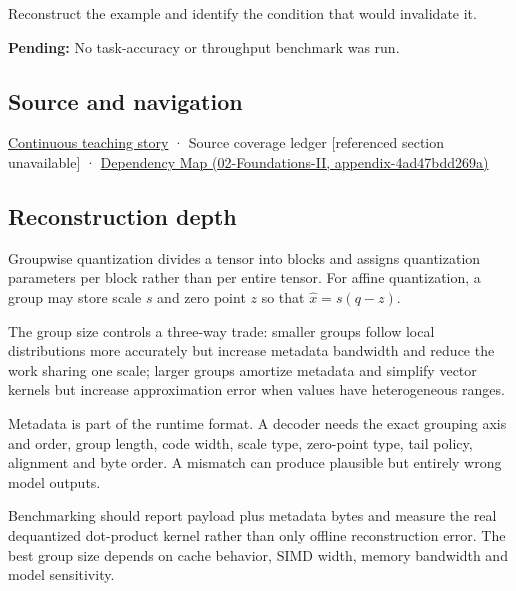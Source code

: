 Reconstruct the example and identify the condition that would invalidate it.

\textbf{Pending:} No task-accuracy or throughput benchmark was run.

\subsection{Source and navigation}\label{appendix-638204c40e8b-source-and-navigation}

\hyperref[01-foundations-i-ch001-choosing-what-information-to-keep]{Continuous teaching story} · {Source coverage ledger {[}referenced section unavailable{]}} · \href{../02-Foundations-II/main.pdf\#nameddest=appendix-4ad47bdd269a}{Dependency Map (02-Foundations-II, appendix-4ad47bdd269a)}

\subsection{Reconstruction depth}\label{appendix-638204c40e8b-reconstruction-depth}

Groupwise quantization divides a tensor into blocks and assigns quantization parameters per block rather than per entire tensor. For affine quantization, a group may store scale \(s\) and zero point \(z\) so that \(\hat x=s(q-z)\).

The group size controls a three-way trade: smaller groups follow local distributions more accurately but increase metadata bandwidth and reduce the work sharing one scale; larger groups amortize metadata and simplify vector kernels but increase approximation error when values have heterogeneous ranges.

Metadata is part of the runtime format. A decoder needs the exact grouping axis and order, group length, code width, scale type, zero-point type, tail policy, alignment and byte order. A mismatch can produce plausible but entirely wrong model outputs.

Benchmarking should report payload plus metadata bytes and measure the real dequantized dot-product kernel rather than only offline reconstruction error. The best group size depends on cache behavior, SIMD width, memory bandwidth and model sensitivity.
